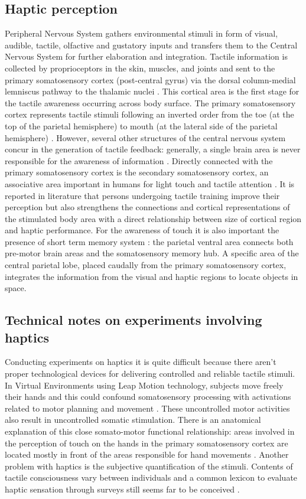 \documentclass{vgtc}
\begin{document}
\subsection{Haptic perception}
Peripheral Nervous System gathers environmental stimuli in form of visual, audible, tactile, olfactive and gustatory inputs and transfers them to the Central Nervous System for further elaboration and integration. Tactile information is collected by proprioceptors in the skin, muscles, and joints and sent to the primary somatosensory cortex (post-central gyrus) via the dorsal column-medial lemniscus pathway to the thalamic nuclei \cite{Blatow2007}. This cortical area is the first stage for the tactile awareness occurring across body surface. The primary somatosensory cortex represents tactile stimuli following an inverted order from the toe (at the top of the parietal hemisphere) to mouth (at the lateral side of the parietal hemisphere) \cite{Narici1999}. However, several other structures of the central nervous system concur in the generation of tactile feedback: generally, a single brain area is never responsible for the awareness of information \cite{Manzoni1986}. Directly connected with the primary somatosensory cortex is the secondary somatosensory cortex, an associative area important in humans for light touch and tactile attention \cite{Eickhoff2005}. It is reported in literature that persons undergoing tactile training improve their perception but also strengthens the connections and cortical representations of the stimulated body area \cite{Saito2007} with a direct relationship between size of cortical region and haptic performance. For the awareness of touch it is also important the presence of short term memory system \cite{Edelman1989}: the parietal ventral area connects both pre-motor brain areas and the somatosensory memory hub. A specific area of the central parietal lobe, placed caudally from the primary somatosensory cortex, integrates the information from the visual and haptic regions to locate objects in space. 

\subsection{Technical notes on experiments involving haptics}
Conducting experiments on haptics it is quite difficult because there aren’t proper technological devices for delivering controlled and reliable tactile stimuli. In Virtual Environments using Leap Motion technology, subjects move freely their hands and this could confound somatosensory processing with activations related to motor planning and movement \cite{Bodegard2001}. These uncontrolled motor activities also result in uncontrolled somatic stimulation. There is an anatomical explanation of this close somato-motor functional relationship: areas involved in the perception of touch on the hands in the primary somatosensory cortex are located mostly in front of the areas responsible for hand movements \cite{Penfield1950}.
Another problem with haptics is the subjective quantification of the stimuli. Contents of tactile consciousness vary between individuals and a common lexicon to evaluate haptic sensation through surveys still seems far to be conceived \cite{Gallace2010}.
\end{document}
